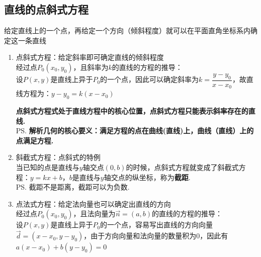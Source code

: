 \subsection*{直线的点斜式方程}
给定直线上的一个点，再给定一个方向（倾斜程度）就可以在平面直角坐标系内确定这一条直线
\begin{enumerate}
    \item 点斜式方程：给定斜率即可确定直线的倾斜程度 \\
    经过点$P_0(x_0, y_0)$，且斜率为$k$的直线的方程的推导：\\
    设$P(x, y)$是直线上异于$P_0$的一个点，因此可以确定斜率为$k = \dfrac{y - y_0}{x - x_0}$，故直线方程为：$y - y_0 = k(x-x_0)$ 
    \textbf{点斜式方程式处于直线方程中的核心位置，点斜式方程只能表示斜率存在的直线.} \\
    \ps \textbf{解析几何的核心要义：满足方程的点在曲线(直线)上，曲线（直线）上的点满足方程.}
    \item 斜截式方程：点斜式的特例 \\
    当已知的点是直线与$y$轴交点$(0, b)$的时候，点斜式方程就变成了斜截式方程：$y = kx + b$，$b$是直线与$y$轴交点的纵坐标，称为\textbf{截距}. \\
    \ps 截距不是距离，截距可以为负数.
    \item 点法式方程：给定法向量也可以确定出直线的方向 \\
    经过点$P_0(x_0, y_0)$，且法向量为$\vec{n} = (a, b)$的直线的方程的推导： \\
    设$P(x, y)$是直线上异于$P_0$的一个点，容易写出直线的方向向量$\vec{d} = (x-x_0, y - y_0)$，由于方向向量和法向量的数量积为0，因此有$a(x-x_0)+b(y-y_0) = 0$
\end{enumerate}
